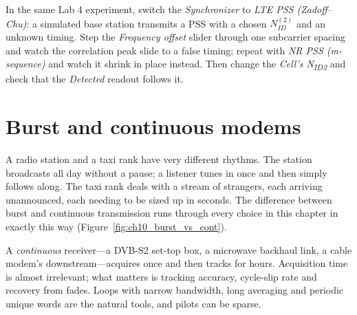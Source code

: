 \begin{tryit}
In the same Lab 4 experiment, switch the \emph{Synchronizer} to \emph{LTE PSS (Zadoff--Chu)}: a
simulated base station transmits a PSS with a chosen $N_{ID}^{(2)}$ and an unknown timing. Step the
\emph{Frequency offset} slider through one subcarrier spacing and watch the correlation peak slide to
a false timing; repeat with \emph{NR PSS (m-sequence)} and watch it shrink in place instead. Then
change the \emph{Cell's N\textsubscript{ID2}} and check that the \emph{Detected} readout follows it.
\end{tryit}

\section{Burst and continuous modems}
\label{sec:ch10:burst}

A radio station and a taxi rank have very different rhythms. The station broadcasts all day
without a pause; a listener tunes in once and then simply follows along. The taxi rank deals with
a stream of strangers, each arriving unannounced, each needing to be sized up in seconds. The
difference between burst and continuous transmission runs through every choice in this chapter
in exactly this way (Figure~\ref{fig:ch10_burst_vs_cont}).


A \emph{continuous} receiver---a DVB-S2 set-top box, a microwave backhaul link, a cable modem's
downstream---acquires once and then tracks for hours. Acquisition time is almost irrelevant; what
matters is tracking accuracy, cycle-slip rate and recovery from fades. Loops with narrow bandwidth,
long averaging and periodic unique words are the natural tools, and pilots can be sparse.

